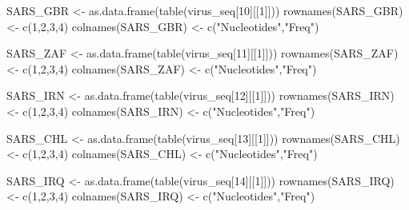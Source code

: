 \documentclass[
]{article}
\newenvironment{Shaded}{\begin{snugshade}}{\end{snugshade}}
\newcommand{\DecValTok}[1]{\textcolor[rgb]{0.00,0.00,0.81}{#1}}
\newcommand{\FunctionTok}[1]{\textcolor[rgb]{0.00,0.00,0.00}{#1}}
\newcommand{\NormalTok}[1]{#1}
\newcommand{\OtherTok}[1]{\textcolor[rgb]{0.56,0.35,0.01}{#1}}
\newcommand{\StringTok}[1]{\textcolor[rgb]{0.31,0.60,0.02}{#1}}
\begin{document}
\begin{Shaded}
\begin{Highlighting}[]
\NormalTok{SARS\_GBR }\OtherTok{\textless{}{-}} \FunctionTok{as.data.frame}\NormalTok{(}\FunctionTok{table}\NormalTok{(virus\_seq[}\DecValTok{10}\NormalTok{][[}\DecValTok{1}\NormalTok{]]))}
\FunctionTok{rownames}\NormalTok{(SARS\_GBR) }\OtherTok{\textless{}{-}} \FunctionTok{c}\NormalTok{(}\DecValTok{1}\NormalTok{,}\DecValTok{2}\NormalTok{,}\DecValTok{3}\NormalTok{,}\DecValTok{4}\NormalTok{)}
\FunctionTok{colnames}\NormalTok{(SARS\_GBR) }\OtherTok{\textless{}{-}} \FunctionTok{c}\NormalTok{(}\StringTok{"Nucleotides"}\NormalTok{,}\StringTok{"Freq"}\NormalTok{)}

\NormalTok{SARS\_ZAF }\OtherTok{\textless{}{-}} \FunctionTok{as.data.frame}\NormalTok{(}\FunctionTok{table}\NormalTok{(virus\_seq[}\DecValTok{11}\NormalTok{][[}\DecValTok{1}\NormalTok{]]))}
\FunctionTok{rownames}\NormalTok{(SARS\_ZAF) }\OtherTok{\textless{}{-}} \FunctionTok{c}\NormalTok{(}\DecValTok{1}\NormalTok{,}\DecValTok{2}\NormalTok{,}\DecValTok{3}\NormalTok{,}\DecValTok{4}\NormalTok{)}
\FunctionTok{colnames}\NormalTok{(SARS\_ZAF) }\OtherTok{\textless{}{-}} \FunctionTok{c}\NormalTok{(}\StringTok{"Nucleotides"}\NormalTok{,}\StringTok{"Freq"}\NormalTok{)}

\NormalTok{SARS\_IRN }\OtherTok{\textless{}{-}} \FunctionTok{as.data.frame}\NormalTok{(}\FunctionTok{table}\NormalTok{(virus\_seq[}\DecValTok{12}\NormalTok{][[}\DecValTok{1}\NormalTok{]]))}
\FunctionTok{rownames}\NormalTok{(SARS\_IRN) }\OtherTok{\textless{}{-}} \FunctionTok{c}\NormalTok{(}\DecValTok{1}\NormalTok{,}\DecValTok{2}\NormalTok{,}\DecValTok{3}\NormalTok{,}\DecValTok{4}\NormalTok{)}
\FunctionTok{colnames}\NormalTok{(SARS\_IRN) }\OtherTok{\textless{}{-}} \FunctionTok{c}\NormalTok{(}\StringTok{"Nucleotides"}\NormalTok{,}\StringTok{"Freq"}\NormalTok{)}

\NormalTok{SARS\_CHL }\OtherTok{\textless{}{-}} \FunctionTok{as.data.frame}\NormalTok{(}\FunctionTok{table}\NormalTok{(virus\_seq[}\DecValTok{13}\NormalTok{][[}\DecValTok{1}\NormalTok{]]))}
\FunctionTok{rownames}\NormalTok{(SARS\_CHL) }\OtherTok{\textless{}{-}} \FunctionTok{c}\NormalTok{(}\DecValTok{1}\NormalTok{,}\DecValTok{2}\NormalTok{,}\DecValTok{3}\NormalTok{,}\DecValTok{4}\NormalTok{)}
\FunctionTok{colnames}\NormalTok{(SARS\_CHL) }\OtherTok{\textless{}{-}} \FunctionTok{c}\NormalTok{(}\StringTok{"Nucleotides"}\NormalTok{,}\StringTok{"Freq"}\NormalTok{)}

\NormalTok{SARS\_IRQ }\OtherTok{\textless{}{-}} \FunctionTok{as.data.frame}\NormalTok{(}\FunctionTok{table}\NormalTok{(virus\_seq[}\DecValTok{14}\NormalTok{][[}\DecValTok{1}\NormalTok{]]))}
\FunctionTok{rownames}\NormalTok{(SARS\_IRQ) }\OtherTok{\textless{}{-}} \FunctionTok{c}\NormalTok{(}\DecValTok{1}\NormalTok{,}\DecValTok{2}\NormalTok{,}\DecValTok{3}\NormalTok{,}\DecValTok{4}\NormalTok{)}
\FunctionTok{colnames}\NormalTok{(SARS\_IRQ) }\OtherTok{\textless{}{-}} \FunctionTok{c}\NormalTok{(}\StringTok{"Nucleotides"}\NormalTok{,}\StringTok{"Freq"}\NormalTok{)}


\end{Highlighting}
\end{Shaded}
\end{document}
